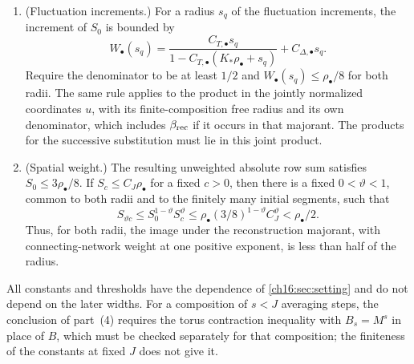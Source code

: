 \begin{lemma}
\begin{enumerate}
\[\begin{aligned}
 C_{\Delta,\bullet}C_{a,\bullet}e^{-a_Ww_{\mathrm{bd}}/2}
                      K_*\rho_\bullet&\le\rho_\bullet/16,&
 C_{F,\bullet}\rrecord&\le\rho_\bullet/16,
 \end{aligned}
\]
where $Z_\bullet$ is the classical row majorant of \cref{ch10:thm:whole-image-gauge}, $C_{\Delta,\bullet}$ and $C_{F,\bullet}$ are the constants of \cref{ch16:thm:hybrid-columns}, and $C_{a,\bullet}$ is a summation constant fixed in the proof. These constants are evaluated on the larger auxiliary construction ball, before the radii and widths are chosen. The sum of the four left sides bounds the row sum $S_0$ at $q=0$ by $\rho_\bullet/4$.
\item (Fluctuation increments.) For a radius $s_q$ of the fluctuation increments, the increment of $S_0$ is bounded by
\[
 W_\bullet(s_q)=
 \frac{C_{T,\bullet}s_q}
      {1-C_{T,\bullet}(K_*\rho_\bullet+s_q)}
                         +C_{\Delta,\bullet}s_q.
\]
Require the denominator to be at least $1/2$ and $W_\bullet(s_q)\le\rho_\bullet/8$ for both radii. The same rule applies to the product in the jointly normalized coordinates $u$, with its finite-composition free radius and its own denominator, which includes $\beta_{\mathrm{rec}}$ if it occurs in that majorant. The products for the successive substitution must lie in this joint product.
\item (Spatial weight.) The resulting unweighted absolute row sum satisfies $S_0\le3\rho_\bullet/8$. If $S_c\le C_J\rho_\bullet$ for a fixed $c>0$, then there is a fixed $0<\vartheta<1$, common to both radii and to the finitely many initial segments, such that
\[
 S_{\vartheta c}\le S_0^{1-\vartheta}S_c^\vartheta
   \le\rho_\bullet(3/8)^{1-\vartheta}C_J^\vartheta
                                      <\rho_\bullet/2.
\]
Thus, for both radii, the image under the reconstruction majorant, with connecting-network weight at one positive exponent, is less than half of the radius.
\end{enumerate}
All constants and thresholds have the dependence of \cref{ch16:sec:setting} and do not depend on the later widths. For a composition of $s<J$ averaging steps, the conclusion of part~(4) requires the torus contraction inequality with $B_s=M^s$ in place of $B$, which must be checked separately for that composition; the finiteness of the constants at fixed $J$ does not give it.
\end{lemma}

